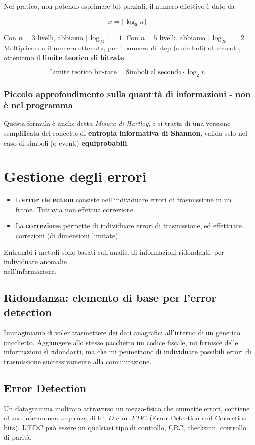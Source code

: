 Nel pratico, non potendo esprimere bit parziali, il numero effettivo è dato da

$$
x= \lfloor\log_2 n\rfloor
$$

Con $n=3$ livelli, abbiamo $\lfloor\log_23\rfloor=1$. Con $n=5$ livelli, abbiamo $\lfloor\log_25\rfloor=2$.
Moltiplicando il numero ottenuto, per il numero di step (o simboli) al secondo, otteniamo il \textbf{limite teorico di bitrate}.

$$
\text{Limite teorico bit-rate} = \text{Simboli al secondo} \cdot \log_2 n
$$
\subsubsection{Piccolo approfondimento sulla quantità di informazioni - non è nel programma}
Questa formula è anche detta \textit{Misura di Hartley}, e si tratta di una versione semplificata del concetto di \textbf{entropia informativa di Shannon}, valida solo nel caso di simboli (o eventi) \textbf{equiprobabili}.
\newpage

\section{Gestione degli errori}

\begin{itemize}
	\item L'\textbf{error detection} consiste nell'individuare errori di trasmissione in un frame. Tuttavia non effettua correzione.
	
	\item La \textbf{correzione} permette di individuare errori di trasmissione, ed effettuare correzioni (di dimensioni limitate).
\end{itemize}
Entrambi i metodi sono basati sull'analisi di informazioni ridondanti, per individuare anomalie \\nell'informazione.

\subsection{Ridondanza: elemento di base per l'error detection}
Immaginiamo di voler trasmettere dei dati anagrafici all'interno di un generico pacchetto. Aggiungere allo stesso pacchetto un codice fiscale, mi fornisce delle informazioni sì ridondanti, ma che mi permettono di individuare possibili errori di trasmissione successivamente alla comunicazione.

\subsection{Error Detection}
Un datagramma inoltrato attraverso un mezzo-fisico che ammette errori, contiene al suo interno una sequenza di bit $D$ e un $EDC$ (Error Detection and Correction bits). L'EDC può essere un qualsiasi tipo di controllo, CRC, checksum, controllo di parità.


